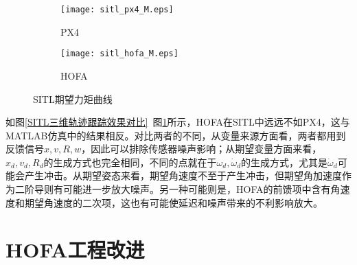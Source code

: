 \begin{figure}[H]
  \centering
\begin{subfigure}[b]{0.49\linewidth}
    \texttt{[image: sitl\_px4\_M.eps]}
    \caption{PX4}
\end{subfigure}
\hfill
\begin{subfigure}[b]{0.49\linewidth}
    \texttt{[image: sitl\_hofa\_M.eps]}
    \caption{HOFA}
\end{subfigure}
\caption{SITL期望力矩曲线}
\label{SITL期望力矩曲线}
\end{figure}

如图\ref{SITL三维轨迹跟踪效果对比}~图\ref{SITL期望力矩曲线}所示，HOFA在SITL中远远不如PX4，这与MATLAB仿真中的结果相反。对比两者的不同，从变量来源方面看，两者都用到反馈信号$x,v,R,w$，因此可以排除传感器噪声影响；从期望变量方面来看，$x_d,v_d,R_d$的生成方式也完全相同，不同的点就在于$\omega_d,\dot \omega_d$的生成方式，尤其是$\dot \omega_d$可能会产生冲击。从期望姿态来看，期望角速度不至于产生冲击，但期望角加速度作为二阶导则有可能进一步放大噪声。另一种可能则是，HOFA的前馈项中含有角速度和期望角速度的二次项，这也有可能使延迟和噪声带来的不利影响放大。

\section{HOFA工程改进}

